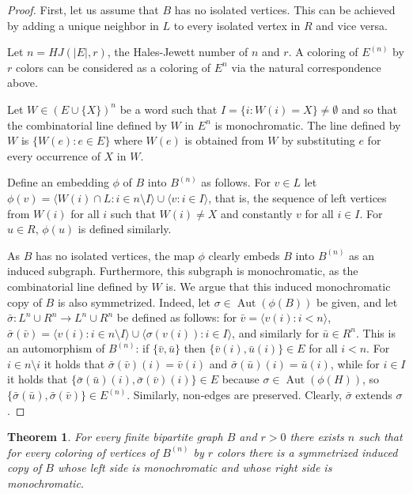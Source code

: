 \documentclass[11pt]{amsart}
\newcommand{\rng}{\rangle}
\newcommand{\lng}{\langle}
\newcommand{\sm}{\setminus}
\newcommand{\aut}{\operatorname{Aut}}
\newtheorem{theorem}{Theorem}[section]
\begin{document}
\begin{proof}
  First, let us assume that $B$ has no isolated vertices. This can be
  achieved by adding a unique neighbor in $L$ to every isolated
  vertex in $R$ and vice versa.


Let $n=HJ(|E|,r)$, the Hales-Jewett number of $n$ and $r$. A
coloring of $E^{(n)}$ by $r$ colors can be considered as a
coloring of $E^n$ via
 the natural correspondence above.

 Let $W\in
(E\cup\{X\})^n$ be a word such that $I=\{i:
W(i)=X\}\not=\emptyset$ and so that the combinatorial line
defined by $W$ in $E^n$ is monochromatic. The line defined by $W$
is $\{W(e):e\in E\}$ where $W(e)$ is obtained from $W$ by
substituting $e$ for every occurrence of $X$ in $W$.

Define an embedding $\phi$  of $B$ into $B^{(n)}$ as follows. For
$v\in L$ let $\phi(v)=\lng W(i)\cap L: i\in n\sm I\rng\cup \lng v:
i\in I\rng$, that is, the sequence of left vertices from $W(i)$
for all $i$ such that $W(i)\not=X$ and constantly $v$ for all
$i\in I$. For $u\in R$, $\phi(u)$ is defined similarly.

As $B$ has no isolated vertices, the map $\phi$ clearly embeds $B$
into $B^{(n)}$ as an induced subgraph. Furthermore, this subgraph
is monochromatic, as the combinatorial line defined by $W$ is. We
argue that this induced monochromatic copy of $B$ is also
symmetrized. Indeed, let $\sigma\in \aut (\phi(B))$ be given, and
let $\bar \sigma:L^n\cup R^n\to L^n\cup R^n$ be defined as
follows: for $\bar v= \lng v(i):i<n\rng$, $\bar \sigma(\bar
v)=\lng v(i):i\in n\sm I\rng \cup \lng \sigma(v(i)):i\in I\rng$,
and similarly for $\bar u\in R^n$. This is an automorphism of
$B^{(n)}$: if $\{ \bar v,\bar u\}$ then $\{\bar v(i),\bar
u(i)\}\in E$ for all $i<n$. For $i\in n\sm i$ it holds that $\bar
\sigma (\bar v)(i)=\bar v(i)$ and $\bar \sigma(\bar u)(i)=\bar
u(i)$, while for $i\in I$ it holds that $\{\bar \sigma(\bar
u)(i),\bar\sigma(\bar v)(i)\}\in E$ because $\sigma \in \aut
(\phi(H))$, so $\{\bar\sigma(\bar u),\bar\sigma(\bar v)\}\in
E^{(n)}$. Similarly, non-edges are preserved. Clearly, $\bar
\sigma$ extends $\sigma$.
\end{proof}

\begin{theorem}\label{bip2}
  For every finite bipartite graph $B$ and $r>0$ there exists $n$ such
  that for every coloring of vertices of $B^{(n)}$ by $r$ colors there
  is a symmetrized induced copy of $B$ whose left side is
  monochromatic and whose right side is monochromatic.
\end{theorem}
\end{document}
